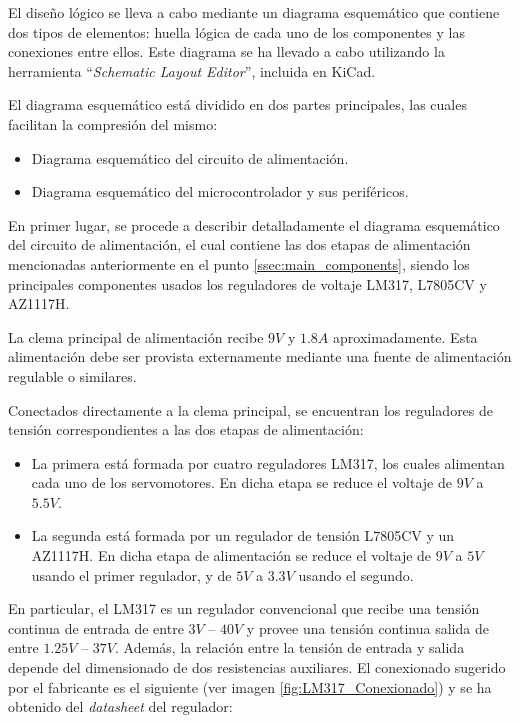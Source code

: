 El diseño lógico se lleva a cabo mediante un diagrama esquemático que contiene dos tipos de elementos: huella lógica de cada uno de los componentes y las conexiones entre ellos. Este diagrama se ha llevado a cabo utilizando la herramienta ``\textit{Schematic Layout Editor}'', incluida en KiCad.

El diagrama esquemático está dividido en dos partes principales, las cuales facilitan la compresión del mismo:
\begin{itemize}
    \item Diagrama esquemático del circuito de alimentación.
    \item Diagrama esquemático del microcontrolador y sus periféricos.
\end{itemize}

En primer lugar, se procede a describir detalladamente el diagrama esquemático del circuito de alimentación, el cual contiene las dos etapas de alimentación mencionadas anteriormente en el punto \ref{ssec:main_components}, siendo los principales componentes usados los reguladores de voltaje LM317, L7805CV y AZ1117H.

La clema principal de alimentación recibe $9V$ y $1.8A$ aproximadamente. Esta alimentación debe ser provista externamente mediante una fuente de alimentación regulable o similares. 

Conectados directamente a la clema principal, se encuentran los reguladores de tensión correspondientes a las dos etapas de alimentación:
\begin{itemize}
    \item La primera está formada por cuatro reguladores LM317, los cuales alimentan cada uno de los servomotores. En dicha etapa se reduce el voltaje de $9V$ a $5.5V$.
    
    \item La segunda está formada por un regulador de tensión L7805CV y un AZ1117H. En dicha etapa de alimentación se reduce el voltaje de $9V$ a $5V$ usando el primer regulador, y de $5V$ a $3.3V$ usando el segundo.
\end{itemize}


En particular, el LM317 es un regulador convencional que recibe una tensión continua de entrada de entre $3V$ -- $40V$ y provee una tensión continua salida de entre $1.25V$ -- $37V$. Además, la relación entre la tensión de entrada y salida depende del dimensionado de dos resistencias auxiliares. El conexionado sugerido por el fabricante es el siguiente (ver imagen \ref{fig:LM317_Conexionado}) y se ha obtenido del \textit{datasheet} del regulador:


